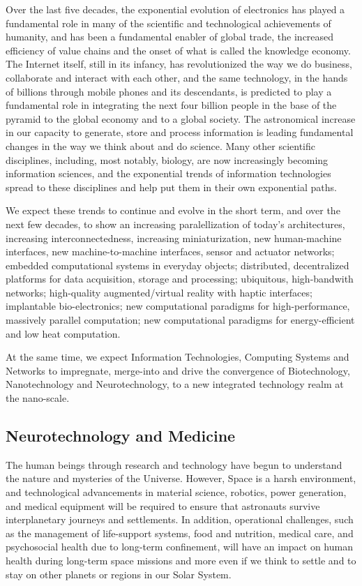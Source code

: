 \documentclass[letter,11pt]{article}
\begin{document}
Over the last five decades, the exponential evolution of electronics has
played a fundamental role in many of the scientific and technological
achievements of humanity, and has been a fundamental enabler of global trade,
the increased efficiency of value chains and the onset of what is called the
knowledge economy. The Internet itself, still in its infancy, has
revolutionized the way we do business, collaborate and interact with each
other, and the same technology, in the hands of billions through mobile phones
and its descendants, is predicted to play a fundamental role in integrating the
next four billion people in the base of the pyramid to the global economy and
to a global society. The astronomical increase in our capacity to generate,
store and process information is leading fundamental changes in the way we
think about and do science. Many other scientific disciplines, including, most
notably, biology, are now increasingly becoming information sciences, and the
exponential trends of information technologies spread to these disciplines and
help put them in their own exponential paths. 

We expect these trends to continue and evolve in the short term, and over the
next few decades, to show an increasing paralellization of today's
architectures, increasing interconnectedness, increasing miniaturization, new
human-machine interfaces, new machine-to-machine interfaces, sensor and
actuator networks; embedded computational systems in everyday objects;
distributed, decentralized platforms for data acquisition, storage and
processing; ubiquitous, high-bandwith networks; high-quality augmented/virtual
reality with haptic interfaces; implantable bio-electronics; new computational
paradigms for high-performance, massively parallel computation; new
computational paradigms for energy-efficient and low heat computation.

At the same time, we expect Information Technologies, Computing Systems and
Networks to impregnate, merge-into and drive the convergence of Biotechnology,
Nanotechnology and Neurotechnology, to a new integrated technology realm at the
nano-scale.


\subsection{Neurotechnology and Medicine}
\label{et-neuro}

The human beings through research and technology have begun to understand the
nature and mysteries of the Universe. However, Space is a harsh environment,
and technological advancements in material science, robotics, power generation,
and medical equipment will be required to ensure that astronauts survive
interplanetary journeys and settlements. In addition, operational challenges,
such as the management of life-support systems, food and nutrition, medical
care, and psychosocial health due to long-term confinement, will have an impact
on human health during long-term space missions and more even if we think to
settle and to stay on other planets or regions in our Solar System.
 
\end{document}
